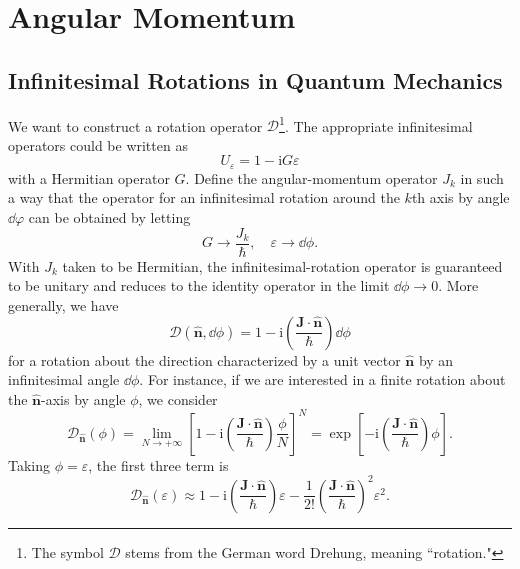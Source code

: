 \documentclass{article}
\theoremstyle{1}
\newcommand{\ii}{\mathrm{i}}
\begin{document}
\section{Angular Momentum}
\subsection{Infinitesimal Rotations in Quantum Mechanics}

We want to construct a rotation operator $\mathscr{D}$\footnote{The symbol $\mathscr{D}$ stems from the German word Drehung, meaning ``rotation."}. The appropriate infinitesimal operators could be
written as
\begin{equation}
    U_{\varepsilon}=1-\ii G\varepsilon
\end{equation}
with a Hermitian operator $G$. Define the angular-momentum operator
$J_k$ in such a way that the operator for an infinitesimal rotation around the $k$th axis
by angle $\dd{\varphi}$ can be obtained by letting 
\begin{equation}
    G\rightarrow \frac{J_k}{\hbar},\quad \varepsilon\rightarrow \dd{\phi}.
\end{equation}
With $J_k$ taken to be Hermitian, the infinitesimal-rotation operator is
guaranteed to be unitary and reduces to the identity operator in the limit $\dd{\phi}\rightarrow 0$. More generally, we have
\begin{equation}
    \mathscr{D}(\hat{\mathbf{n}},\dd{\phi})=1-\ii\left(\frac{\mathbf{J}\cdot\hat{\mathbf{n}}}{\hbar}\right)\dd{\phi}
\end{equation}
for a rotation about the direction characterized by a unit vector $\hat{\mathbf{n}}$ by an infinitesimal angle $\dd{\phi}$. For instance, if we are interested in a finite rotation
about the $\hat{\mathbf{n}}$-axis by angle $\phi$, we consider
\begin{equation}
    \mathscr{D}_{\hat{\mathbf{n}}}(\phi)=\lim_{N\rightarrow +\infty}\left[1-\ii\left(\frac{\mathbf{J}\cdot\hat{\mathbf{n}}}{\hbar}\right)\frac{\phi}{N}\right]^N=\exp\left[-\ii\left(\frac{\mathbf{J}\cdot\hat{\mathbf{n}}}{\hbar}\right)\phi\right].
\end{equation}
Taking $\phi=\varepsilon$, the first three term is 
\begin{equation}
    \mathscr{D}_{\hat{\mathbf{n}}}(\varepsilon)\approx 1-\ii\left(\frac{\mathbf{J}\cdot\hat{\mathbf{n}}}{\hbar}\right)\varepsilon-\frac{1}{2!}\left(\frac{\mathbf{J}\cdot\hat{\mathbf{n}}}{\hbar}\right)^2\varepsilon^2.
\end{equation}
\end{document}
